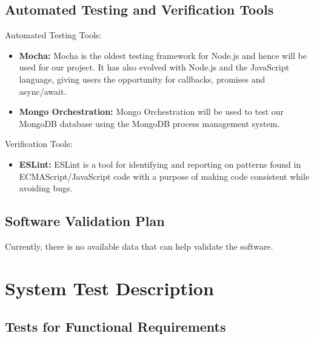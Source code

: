 \documentclass[12pt, titlepage]{article}
\begin{document}
\subsection{Automated Testing and Verification Tools}
Automated Testing Tools:
\begin{itemize}
    \item \textbf{Mocha:} Mocha is the oldest testing framework for Node.js and hence will be used for our project. It has also evolved with Node.js and the JavaScript language, giving users the opportunity for callbacks, promises and async/await. 
    \item \textbf{Mongo Orchestration:} Mongo Orchestration will be used to test our MongoDB database using the MongoDB process management system.
\end{itemize}
Verification Tools:
\begin{itemize}
    \item \textbf{ESLint:} ESLint is a tool for identifying and reporting on patterns found in ECMAScript/JavaScript code with a purpose of making code consistent while avoiding bugs.
\end{itemize}

\subsection{Software Validation Plan}

Currently, there is no available data that can help validate the software.




\section{System Test Description}
	
\subsection{Tests for Functional Requirements}
\end{document}
